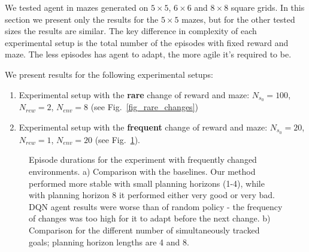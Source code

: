 \documentclass[a4paper,twoside]{article}
\begin{document}
We tested agent in mazes generated on $5 \times 5$, $6 \times 6$ and $8 \times 8$ square grids. In this section we present only the results for the $5 \times 5$ mazes, but for the other tested sizes the results are similar. The key difference in complexity of each experimental setup is the total number of the episodes with fixed reward and maze. The less episodes has agent to adapt, the more agile it's required to be.

We present results for the following experimental setups:

\begin{enumerate}
  \item Experimental setup with the \textbf{rare} change of reward and maze: $N_{s_0} = 100$, $N_{rew} = 2$, $N_{env} = 8$ (see Fig.~\ref{fig_rare_changes})

  \item Experimental setup with the \textbf{frequent} change of reward and maze: $N_{s_0} = 20$, $N_{rew} = 1$, $N_{env} = 20$ (see Fig.~\ref{fig_frequent_changes}).
\end{enumerate}

\begin{figure}
  \centering
  \begin{minipage}{.95\linewidth}
    
    \subcaption{}
    \vspace*{10pt}


    
    \subcaption{}
    
    \vspace*{4pt}
  \end{minipage}

  \caption{Episode durations for the experiment with frequently changed environments. a) Comparison with the baselines. Our method performed more stable with small planning horizons (1-4), while with planning horizon 8 it performed either very good or very bad. DQN agent results were worse than of random policy - the frequency of changes was too high for it to adapt before the next change. b) Comparison for the different number of simultaneously tracked goals; planning horizon lengths are 4 and 8.} \label{fig_frequent_changes}
\end{figure}
\end{document}
